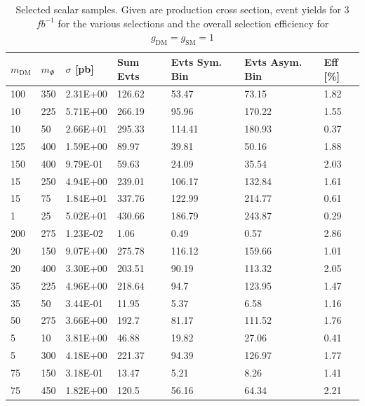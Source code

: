 \begin{table}[h]
\centering
\begin{tabular}{lllllll}
\hline
$m_\textrm{DM}$ & $m_\Phi$ & $\sigma$ [pb] & Sum Evts       & Evts Sym. Bin & Evts Asym. Bin & Eff  [\%]   \\\hline
100   &  350 & 2.31E+00 & 126.62 & 53.47  & 73.15  & 1.82 \\
10   &  225  & 5.71E+00 & 266.19 & 95.96  & 170.22 & 1.55 \\
10   &  50   & 2.66E+01 & 295.33 & 114.41 & 180.93 & 0.37 \\
125   &  400 & 1.59E+00 & 89.97  & 39.81  & 50.16  & 1.88 \\
150   &  400 & 9.79E-01 & 59.63  & 24.09  & 35.54  & 2.03 \\
15   &  250  & 4.94E+00 & 239.01 & 106.17 & 132.84 & 1.61 \\
15   &  75   & 1.84E+01 & 337.76 & 122.99 & 214.77 & 0.61 \\
1   &  25    & 5.02E+01 & 430.66 & 186.79 & 243.87 & 0.29 \\
200   &  275 & 1.23E-02 & 1.06   & 0.49   & 0.57   & 2.86 \\
20   &  150  & 9.07E+00 & 275.78 & 116.12 & 159.66 & 1.01 \\
20   &  400  & 3.30E+00 & 203.51 & 90.19  & 113.32 & 2.05 \\
35   &  225  & 4.96E+00 & 218.64 & 94.7   & 123.95 & 1.47 \\
35   &  50   & 3.44E-01 & 11.95  & 5.37   & 6.58   & 1.16 \\
50   &  275  & 3.66E+00 & 192.7  & 81.17  & 111.52 & 1.76 \\
5   &  10    & 3.81E+00 & 46.88  & 19.82  & 27.06  & 0.41 \\
5   &  300   & 4.18E+00 & 221.37 & 94.39  & 126.97 & 1.77 \\
75   &  150  & 3.18E-01 & 13.47  & 5.21   & 8.26   & 1.41 \\
75   &  450  & 1.82E+00 & 120.5  & 56.16  & 64.34  & 2.21\\
\hline
\end{tabular}
\caption{Selected scalar samples. Given are production cross section, event yields for 3 $fb^{-1 }$ for the various selections and the overall selection efficiency for $g_\textrm{DM}=g_\textrm{SM}=1$}
\label{tab:dm_S_g1_3fb}
\end{table}


